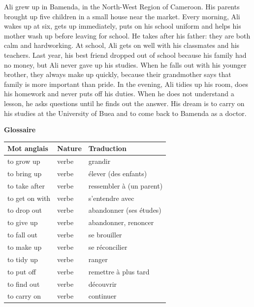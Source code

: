 \documentclass[11pt]{article}
\begin{document}
\begin{textebox}
Ali grew up in Bamenda, in the North-West Region of Cameroon. His parents brought up five children in a small house near the market. Every morning, Ali wakes up at six, gets up immediately, puts on his school uniform and helps his mother wash up before leaving for school. He takes after his father: they are both calm and hardworking. At school, Ali gets on well with his classmates and his teachers. Last year, his best friend dropped out of school because his family had no money, but Ali never gave up his studies. When he falls out with his younger brother, they always make up quickly, because their grandmother says that family is more important than pride. In the evening, Ali tidies up his room, does his homework and never puts off his duties. When he does not understand a lesson, he asks questions until he finds out the answer. His dream is to carry on his studies at the University of Buea and to come back to Bamenda as a doctor.
\end{textebox}

\textbf{Glossaire}

\begin{center}
\begin{tabularx}{\linewidth}{|l|X|l|}\hline
\rowcolor{popblueL} Mot anglais & Nature & Traduction \\ \hline
to grow up & verbe & grandir \\ \hline
to bring up & verbe & élever (des enfants) \\ \hline
to take after & verbe & ressembler à (un parent) \\ \hline
to get on with & verbe & s'entendre avec \\ \hline
to drop out & verbe & abandonner (ses études) \\ \hline
to give up & verbe & abandonner, renoncer \\ \hline
to fall out & verbe & se brouiller \\ \hline
to make up & verbe & se réconcilier \\ \hline
to tidy up & verbe & ranger \\ \hline
to put off & verbe & remettre à plus tard \\ \hline
to find out & verbe & découvrir \\ \hline
to carry on & verbe & continuer \\ \hline
\end{tabularx}
\end{center}
\end{document}
